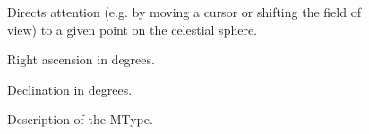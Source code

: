 		\begin{figure}[tbp]
			\centering
			\begin{minipage}{0.9\textwidth}
				\begin{framed}
							{
								Directs attention (e.g. by moving a
								cursor or shifting the field of view)
								to a given point on the celestial
								sphere.
							}
							{
								{Right ascension in degrees.}

								{Declination in degrees.}
							}
							{\mtypeparamnone}
				\end{framed}
			\end{minipage}
			
			\caption[ MType description]
			{Description of the  MType.}
			\label{fig:coordPointAtSkyMtype}
		\end{figure}
		
